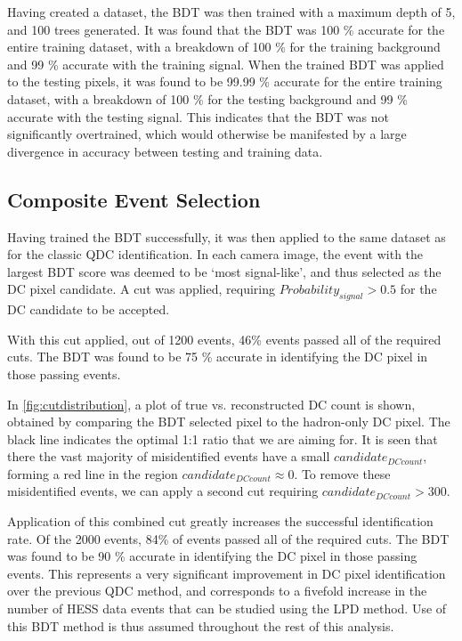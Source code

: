 \documentclass{article}
\begin{document}
Having created a dataset, the BDT was then trained with a maximum depth of 5, and 100 trees generated. It was found that the BDT was 100 \% accurate for the entire training dataset, with a breakdown of 100 \% for the training background and 99 \% accurate with the training signal. When the trained BDT was applied to the testing pixels, it was found to be 99.99 \%  accurate for the entire training dataset, with a breakdown of 100 \% for the testing background and 99 \% accurate with the testing signal. This indicates that the BDT was not significantly overtrained, which would otherwise be manifested by a large divergence in accuracy between testing and training data.

\subsection{Composite Event Selection}
Having trained the BDT successfully, it was then applied to the same dataset as for the classic QDC identification. In each camera image, the event with the largest BDT score was deemed to be \textquoteleft most signal-like', and thus selected as the DC pixel candidate. A cut was applied, requiring $Probability_{signal} > 0.5$ for the DC candidate to be accepted. 

With this cut applied, out of 1200 events, 46\% events passed all of the required cuts. The BDT was found to be 75 \% accurate in identifying the DC pixel in those passing events.

In \ref{fig:cutdistribution}, a plot of true vs. reconstructed DC count is shown, obtained by comparing the BDT selected pixel to the hadron-only DC pixel. The black line indicates the optimal 1:1 ratio that we are aiming for. It is seen that there the vast majority of misidentified events have a small $candidate_{DC count}$, forming a red line in the region $candidate_{DC count} \approx 0$. To remove these misidentified events, we can apply a second cut requiring $candidate_{DC count} > 300$.

Application of this combined cut greatly increases the successful identification rate. Of the 2000 events, 84\% of events passed all of the required cuts. The BDT was found to be 90 \% accurate in identifying the DC pixel in those passing events. This represents a very significant improvement in DC pixel identification over the previous QDC method, and corresponds to a fivefold increase in the number of HESS data events that can be studied using the LPD method. Use of this BDT method is thus assumed throughout the rest of this analysis.
\end{document}
